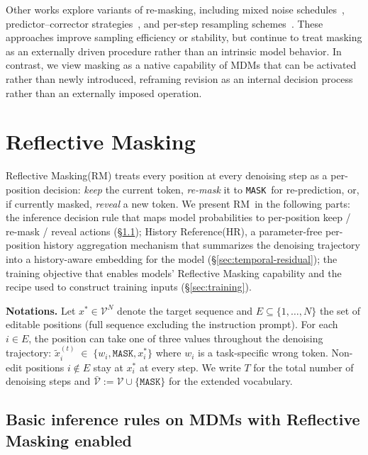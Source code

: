 \documentclass{llmxive}
\providecommand{\methodfull}{Reflective Masking\xspace}
\providecommand{\method}{RM\xspace}
\providecommand{\temporalmethodfull}{History Reference\xspace}
\providecommand{\temporalmethod}{HR\xspace}
\providecommand{\xstar}{x^{\ast}}
\providecommand{\mask}{\texttt{MASK}}
\begin{document}
Other works explore variants of re-masking, including mixed noise schedules~\citep{von2025generalized}, predictor--corrector strategies~\citep{wang2025remasking}, and per-step resampling schemes~\citep{song2025seed}. These approaches improve sampling efficiency or stability, but continue to treat masking as an externally driven procedure rather than an intrinsic model behavior. In contrast, we view masking as a native capability of MDMs that can be activated rather than newly introduced, reframing revision as an internal decision process rather than an externally imposed operation.


\section{\methodfull}
\label{sec:method}

\methodfull (\method) treats every position at every denoising step as a per-position decision: \emph{keep} the current token, \emph{re-mask} it to \mask\ for re-prediction, or, if currently masked, \emph{reveal} a new token. We present \method\ in the following parts: the inference decision rule that maps model probabilities to per-position keep / re-mask / reveal actions (\S\ref{sec:inference}); 
\temporalmethodfull (\temporalmethod), a parameter-free per-position history aggregation mechanism that summarizes the denoising trajectory into a history-aware embedding for the model (\S\ref{sec:temporal-residual});
the training objective that enables models' \methodfull capability and the recipe used to construct training inputs (\S\ref{sec:training}).



\textbf{Notations.} Let $\xstar \in \mathcal{V}^N$ denote the target sequence and $E \subseteq \{1, \ldots, N\}$ the set of editable positions  (full sequence excluding the instruction prompt). For each $i \in E$, the position can take one of three values throughout the denoising trajectory:
$\tilde{x}^{(t)}_i \;\in\; \{w_i, \mask, \xstar_i\}$
where $w_i$ is a task-specific wrong token. Non-edit positions $i \notin E$ stay at $\xstar_i$ at every step. We write $T$ for the total number of denoising steps and $\bar{\mathcal{V}} := \mathcal{V} \cup \{\mask\}$ for the extended vocabulary.



\subsection{Basic inference rules on MDMs with \methodfull enabled}
\label{sec:inference}
\end{document}
